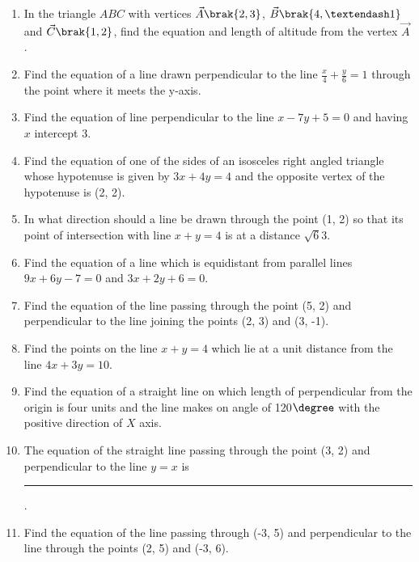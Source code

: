 \begin{enumerate}[label=\thesubsection.\arabic*, ref=\thesubsection.\theenumi]
\label{chapters/11/10/2/8}
\\
\solution

\item In the triangle $ABC$ with vertices $\vec{A} \brak{2,  3}$,  $\vec{B} \brak{4,  –1}$ and $\vec{C} \brak{1,  2}$,  find the equation and length of altitude from the vertex $\vec{A}$.
\label{chapters/11/10/3/17}
\\
\solution

\item Find the equation of a line  drawn perpendicular to the line $\frac{x}{4}+\frac{y}{6}=1$ through the point where it meets the y-axis. \\
\solution
		
\item Find the equation of line perpendicular to the line $x-7y+5=0$ and having $x$ intercept $3$.\\
\label{chapters/11/10/3/8}
\solution

\item Find the equation of one of the sides of an isosceles right angled triangle whose hypotenuse is given by $3x+4y=4$ and the opposite vertex of the hypotenuse is (2, 2).
\item In what direction should a line be drawn through the point (1, 2) so that its point of intersection with line $x+y=4$ is at a distance $\sqrt{6}{3}$. 
\item Find the equation of a line which is equidistant from parallel lines $9x+6y-7=0$ and $3x+2y+6=0$.
\\
\solution
		
\item Find the equation of the line passing through the point (5, 2) and perpendicular to the line joining the points (2, 3) and (3,  -1).
\item Find the points on the line $x+y=4$ which lie at a unit distance from the line $4x+3y=10$.
\item Find the equation of a straight line on which length of perpendicular from the origin is four units and the line makes on angle of 120$\degree$ with the positive direction of $X$ axis. 
\item The equation of the straight line passing through the point (3, 2) and perpendicular to the line $y=x$ is \rule{1cm}{0.1pt}.
\item 
	Find the equation of the line passing through  (-3, 5) and perpendicular to the line through the points (2, 5) and (-3, 6).
	\\
	\solution 
\label{chapters/11/10/2/10}

\end{enumerate}
